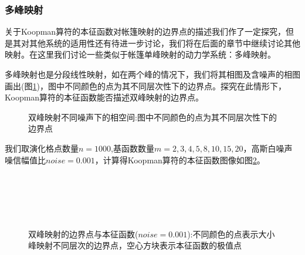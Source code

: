 \subsubsection{多峰映射}

关于Koopman算符的本征函数对帐篷映射的边界点的描述我们作了一定探究，但是其对其他系统的适用性还有待进一步讨论，我们将在后面的章节中继续讨论其他映射。在这里我们讨论一些类似于帐篷单峰映射的动力学系统：多峰映射。

多峰映射也是分段线性映射，如在两个峰的情况下，我们将其相图及含噪声的相图画出(图\ref{fig:Tents5_noise_phase_d0})，图中不同颜色的点为其不同层次性下的边界点。探究在此情形下，Koopman算符的本征函数能否描述双峰映射的边界点。

\begin{figure}[!]
  \centering
  \caption[双峰映射不同噪声下的相空间]{双峰映射不同噪声下的相空间:图中不同颜色的点为其不同层次性下的边界点}\label{fig:Tents5_noise_phase_d0}
\end{figure}

我们取演化格点数量$n=1000$,基函数数量$m=2,3,4,5,8,10,15,20$，高斯白噪声噪信幅值比$noise=0.001$，计算得Koopman算符的本征函数图像如图\ref{fig:Tents5_eigen_noise_n1000m20d0-001}。

\begin{figure}[!]
  \centering%
    \\
    \\
    \\
    \\
    \caption[双峰映射的边界点与本征函数]{双峰映射的边界点与本征函数($noise=0.001$):不同颜色的点表示大小峰映射不同层次的边界点，空心方块表示本征函数的极值点}\label{fig:Tents5_eigen_noise_n1000m20d0-001}
\end{figure}

